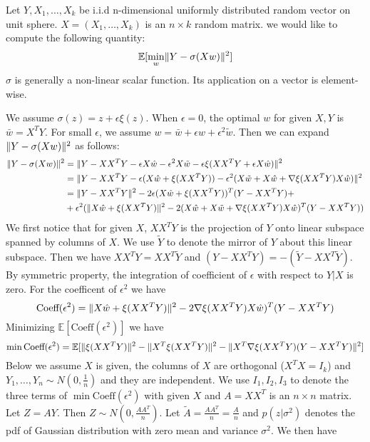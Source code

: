 \documentclass{article}
\DeclarePairedDelimiter\norm{\lVert}{\rVert}
\def\E{\mathbb{E}}
\begin{document}
Let $Y, X_1, \dots, X_k$ be i.i.d n-dimensional uniformly distributed random vector on unit sphere. $X=(X_1, \dots, X_k)$ is an $n\times k$ random matrix. we would like to compute the following quantity:
\begin{equation}
\E[\min_w \norm{Y - \sigma (X w ) }^2]
\end{equation}
$\sigma$ is generally a non-linear scalar function. Its application on a vector is element-wise.

We assume $\sigma(z) = z + \epsilon \xi(z)$. When $\epsilon = 0$, the optimal $w$ for given $X, Y$ is 
$\bar{w} = X^T Y $. For small $\epsilon$, we assume $ w = \bar{w} + \epsilon \hat{w} + \epsilon^2 \tilde{w}$. Then we can expand $\norm{Y - \sigma (X w ) }^2$ as follows:
\begin{align*}
\norm{Y - \sigma (X w ) }^2 & = \norm{Y - XX^T Y - \epsilon X \hat{w} - \epsilon^2 X \tilde{w} - \epsilon \xi(XX^T Y + \epsilon X\hat{w}) }^2 \\
& = \norm{ Y - XX^T Y - \epsilon (X\hat{w} + \xi(XX^T Y)) - \epsilon^2(X\tilde{w} + X\hat{w} + \nabla \xi(XX^TY)X\hat{w})}^2 \\
& = \norm{Y-XX^T Y }^2 - 2 \epsilon (X \hat{w} + \xi(XX^TY))^T (Y-XX^TY) +\\
& +\epsilon^2(\norm{X\hat{w} + \xi(XX^TY)}^2 - 2 (X\hat{w} + X \tilde{w}+ \nabla \xi(XX^TY)X\hat{w})^T(Y-XX^TY))
\end{align*}
We first notice that for given $X$, $XX^TY$ is the projection of $Y$ onto linear subspace spanned by columns of $X$. We use $\tilde{Y}$ to denote the mirror of $Y$ about this linear subspace. Then we have
$XX^T Y = XX^T \tilde{Y}$ and $(Y- XX^TY) = -(\tilde{Y} - XX^T \tilde{Y})$. By symmetric property, the integration of coefficient of $\epsilon$ with respect to $Y|X$ is zero. For the coefficent of $\epsilon^2$ we have
\begin{equation*}
\textrm{Coeff}(\epsilon^2)  =  \norm{X\hat{w} + \xi(XX^TY)}^2 - 2 \nabla \xi(XX^TY)X\hat{w})^T(Y-XX^TY)
\end{equation*}
Minimizing $\E[\textrm{Coeff}(\epsilon^2)]$ we have
\begin{equation}
\min \textrm{Coeff}(\epsilon^2) = \E[\norm{\xi(XX^TY)}^2 - \norm{X^T\xi(XX^TY)}^2 - \norm{X^T \nabla\xi(XX^TY)(Y-XX^TY)}^2]
\end{equation}
Below we assume $X$ is given, the columns of $X$ are orthogonal ($X^TX=I_k$) and $Y_1, \dots, Y_n  \sim N(0, \frac{1}{n})$ and they are independent. We use $I_1, I_2, I_3$ to denote the three terms of $\min \textrm{Coeff}(\epsilon^2)$ with given $X$ and $A=XX^T$ is an $n\times n$ matrix. Let $Z = AY$. Then $Z \sim N(0, \frac{AA^T}{n})$. Let $\widetilde{A} = \frac{AA^T}{n} = \frac{A}{n}$ and $p(z| \sigma^2)$ denotes the pdf of Gaussian distribution with zero mean and variance $\sigma^2$. We then have
\end{document}
